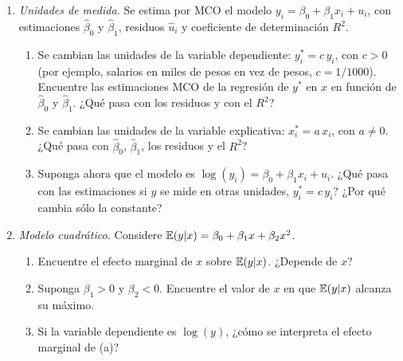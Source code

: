 \documentclass[letterpaper,11pt]{article}
\begin{document}
\begin{enumerate}[itemsep=0.8em]

\item \emph{Unidades de medida.} Se estima por MCO el modelo
    $y_i=\beta_0+\beta_1x_i+u_i$, con estimaciones $\hat\beta_0$ y $\hat\beta_1$, residuos
    $\hat u_i$ y coeficiente de determinación $R^2$.
    \begin{enumerate}
        \item Se cambian las unidades de la variable dependiente: $y_i^*=c\,y_i$, con $c>0$
              (por ejemplo, salarios en miles de pesos en vez de pesos, $c=1/1000$). Encuentre
              las estimaciones MCO de la regresión de $y^*$ en $x$ en función de
              $\hat\beta_0$ y $\hat\beta_1$. ¿Qué pasa con los residuos y con el $R^2$?
        \item Se cambian las unidades de la variable explicativa: $x_i^*=a\,x_i$, con
              $a\neq 0$. ¿Qué pasa con $\hat\beta_0$, $\hat\beta_1$, los residuos y el $R^2$?
        \item Suponga ahora que el modelo es $\log(y_i)=\beta_0+\beta_1x_i+u_i$. ¿Qué pasa con
              las estimaciones si $y$ se mide en otras unidades, $y_i^*=c\,y_i$? ¿Por qué
              cambia sólo la constante?
    \end{enumerate}

\item \emph{Modelo cuadrático.} Considere
    $\operatorname{\mathbb{E}}(y|x)=\beta_0+\beta_1x+\beta_2x^2$.
    \begin{enumerate}
        \item Encuentre el efecto marginal de $x$ sobre $\operatorname{\mathbb{E}}(y|x)$. ¿Depende de $x$?
        \item Suponga $\beta_1>0$ y $\beta_2<0$. Encuentre el valor de $x$ en que $\operatorname{\mathbb{E}}(y|x)$
              alcanza su máximo.
        \item Si la variable dependiente es $\log(y)$, ¿cómo se interpreta el efecto
              marginal de (a)?
    \end{enumerate}


\end{enumerate}
\end{document}

